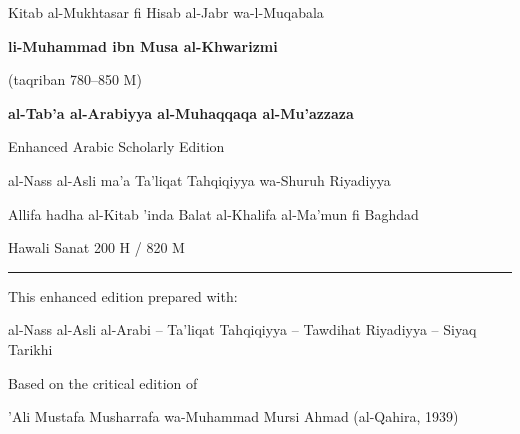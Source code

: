 \documentclass[11pt,a4paper]{book}
\begin{document}
\begin{titlepage}
\begin{center}

\vspace*{1.5cm}

{\fontsize{28}{34}\selectfont\color{titlecolor} Kitab al-Mukhtasar fi Hisab al-Jabr wa-l-Muqabala}

\vspace{0.5cm}

{\LARGE\textbf{li-Muhammad ibn Musa al-Khwarizmi}}

\vspace{0.3cm}

{\normalsize (taqriban 780--850 M)}

\vspace{1.5cm}

\begin{tcolorbox}[colback=arabicbg,colframe=dropgold,arc=4pt,boxrule=1pt,width=0.85\textwidth]
\begin{center}
\large
\textbf{al-Tab'a al-Arabiyya al-Muhaqqaqa al-Mu'azzaza}

\vspace{0.2cm}

Enhanced Arabic Scholarly Edition

\vspace{0.2cm}

al-Nass al-Asli ma'a Ta'liqat Tahqiqiyya wa-Shuruh Riyadiyya
\end{center}
\end{tcolorbox}

\vspace{1.5cm}

{\large Allifa hadha al-Kitab 'inda Balat al-Khalifa al-Ma'mun fi Baghdad}

\vspace{0.5cm}

{\normalsize Hawali Sanat 200 H / 820 M}

\vspace{1.5cm}

\rule{0.3\textwidth}{0.5pt}

\vspace{0.8cm}

{\footnotesize\latinfont This enhanced edition prepared with:}

{\footnotesize al-Nass al-Asli al-Arabi -- Ta'liqat Tahqiqiyya -- Tawdihat Riyadiyya -- Siyaq Tarikhi}

\vspace{0.5cm}

{\footnotesize\latinfont Based on the critical edition of}

{\footnotesize 'Ali Mustafa Musharrafa wa-Muhammad Mursi Ahmad (al-Qahira, 1939)}

\end{center}
\end{titlepage}
\end{document}
